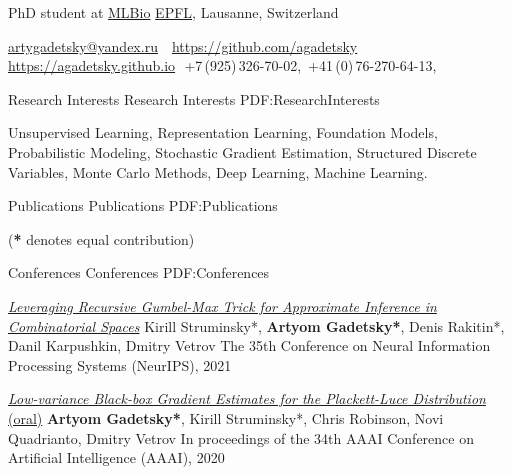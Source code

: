\documentclass[letterpaper,MMMyyyy,nonstopmode]{simpleresumecv}
\newcommand{\CVAuthor}{Artyom Gadetsky}
\begin{document}

\Title{\CVAuthor}

\begin{SubTitle}
PhD student at \href{https://brbiclab.epfl.ch}{MLBio}
\href{https://www.epfl.ch/schools/ic/}{EPFL}, Lausanne, Switzerland
\par
\href{mailto:artygadetsky@yandex.ru}{artygadetsky@yandex.ru}
\,\SubBulletSymbol\,
\href{https://github.com/agadetsky}{https://github.com/agadetsky}
\,\SubBulletSymbol\,\href{https://agadetsky.github.io}{https://agadetsky.github.io}\,\SubBulletSymbol\,
+7\,(925)\,326-70-02,\ +41\,(0)\,76-270-64-13,
\end{SubTitle}

\begin{Body}



\Section
{Research Interests}
{Research Interests}
{PDF:ResearchInterests}

\Item Unsupervised Learning, Representation Learning, Foundation Models, Probabilistic Modeling, Stochastic Gradient Estimation, Structured Discrete Variables, Monte Carlo Methods, Deep Learning, Machine Learning.

\BigGap


\Section
{Publications}
{Publications}
{PDF:Publications}

\Entry
\hfill
(\textbf{*} denotes equal contribution)

\SubSection
{Conferences}
{Conferences}
{PDF:Conferences}

\Item
\href{https://proceedings.neurips.cc/paper/2021/hash/5b658d2a925565f0755e035597f8d22f-Abstract.html}{\textit{Leveraging Recursive Gumbel-Max Trick for Approximate Inference in Combinatorial Spaces}}
\Item
Kirill Struminsky*, \textbf{Artyom Gadetsky*}, Denis Rakitin*, Danil Karpushkin, Dmitry Vetrov
\Item
The 35th Conference on Neural Information Processing Systems (NeurIPS), 2021

\Gap
\Item
\href{https://ojs.aaai.org/index.php/AAAI/article/view/6572}{\textit{Low-variance Black-box Gradient Estimates for the Plackett-Luce Distribution} (oral)}
\Item
\textbf{Artyom Gadetsky*}, Kirill Struminsky*, Chris Robinson, Novi Quadrianto, Dmitry Vetrov
\Item
In proceedings of the 34th AAAI Conference on Artificial Intelligence (AAAI), 2020


\end{Body}
\end{document}
